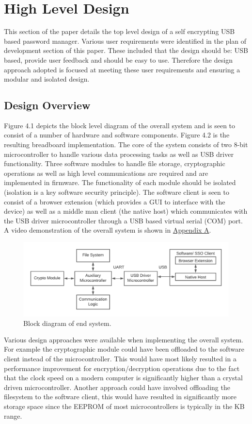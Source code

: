 \section{High Level Design}
This section of the paper details the top level design of a self encrypting USB based password manager. Various user requirements were identified in the plan of development section of this paper. These included that the design should be: USB based, provide user feedback and should be easy to use. Therefore the design approach adopted is focused at meeting these user requirements and ensuring a modular and isolated design.

\subsection{Design Overview}
Figure 4.1 depicts the block level diagram of the overall system and is seen to consist of a number of hardware and software components. Figure 4.2 is the resulting breadboard implementation. The core of the system consists of two 8-bit microcontroller to handle various data processing tasks as well as USB driver functionality. Three software modules to handle file storage, cryptographic operations as well as high level communications are required and are implemented in firmware. The functionality of each module should be isolated (isolation is a key software security principle). The software client is seen to consist of a browser extension (which provides a GUI to interface with the device) as well as a middle man client (the native host) which communicates with the USB driver microcontroller through a USB based virtual serial (COM) port. A video demonstration of the overall system is shown in \hyperref[sec:SystemOverview]{Appendix A}.

\begin{figure}[H]
\centering
\includegraphics[width=0.9\columnwidth]{Figures/Fig_73.png}
\caption{Block diagram of end system.}
\label{fig:gantt}
\end{figure}

Various design approaches were available when implementing the overall system. For example the cryptographic module could have been offloaded to the software client instead of the microcontroller. This would have most likely resulted in a performance improvement for encryption/decryption operations due to the fact that the clock speed on a modern computer is significantly higher than a crystal driven microcontroller. Another approach could have involved offloading the filesystem to the software client, this would have resulted in significantly more storage space since the EEPROM of most microcontrollers is typically in the KB range. 

